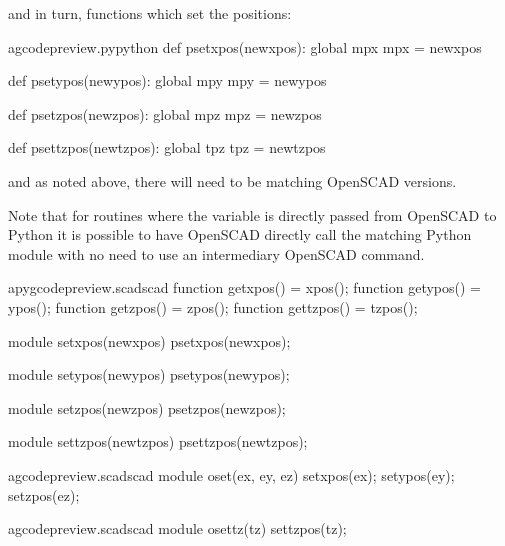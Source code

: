 \documentclass{ltxdoc}
\begin{document}
\noindent and in turn, functions which set the positions: 

\lstset{firstnumber=\thegcpy}
\begin{writecode}{a}{gcodepreview.py}{python}
def psetxpos(newxpos):
    global mpx
    mpx = newxpos

def psetypos(newypos):
    global mpy
    mpy = newypos

def psetzpos(newzpos):
    global mpz
    mpz = newzpos
 
def psettzpos(newtzpos):
    global tpz
    tpz = newtzpos

\end{writecode}
\addtocounter{gcpy}{16}
 
\noindent and as noted above, there will need to be matching OpenSCAD versions. 

\noindent{}%
%
%
%
%
%
%
%
Note that for routines where the variable is directly passed from OpenSCAD to Python
it is possible to have OpenSCAD directly call the matching Python module with no need
to use an intermediary OpenSCAD command.
 
\lstset{firstnumber=\thepyscad}
\begin{writecode}{a}{pygcodepreview.scad}{scad}
function getxpos() = xpos();
function getypos() = ypos();
function getzpos() = zpos();
function gettzpos() = tzpos();

module setxpos(newxpos) {
psetxpos(newxpos);
}

module setypos(newypos) {
psetypos(newypos);
}

module setzpos(newzpos) {
psetzpos(newzpos);
}

module settzpos(newtzpos) {
psettzpos(newtzpos);
}

\end{writecode}
\addtocounter{pyscad}{21}
 
\lstset{firstnumber=\thegcpscad}
\begin{writecode}{a}{gcodepreview.scad}{scad}
module oset(ex, ey, ez) {
setxpos(ex);
setypos(ey);
setzpos(ez);
}

\end{writecode}
\addtocounter{gcpscad}{6}
 
\lstset{firstnumber=\thegcpscad}
\begin{writecode}{a}{gcodepreview.scad}{scad}
module osettz(tz) {
settzpos(tz);
}

\end{writecode}
\addtocounter{gcpscad}{4}
\end{document}

